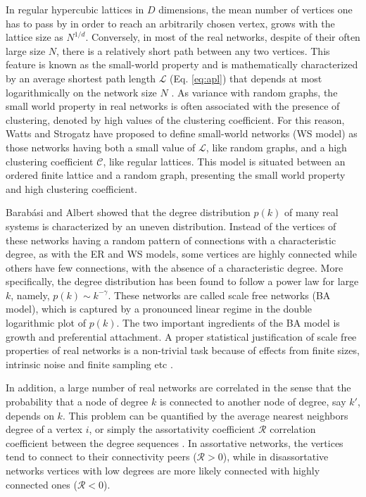 	In regular hypercubic lattices in $D$ dimensions, the mean number of vertices one has to pass by in order to reach an arbitrarily chosen vertex, grows with the lattice size as $N^{1/d}$. Conversely, in most of the real networks, despite of their often large size $N$, there is a relatively short path between any two vertices. This feature is known as the small-world property and is mathematically characterized by an average shortest path length $\mathcal{L}$ (Eq. \eqref{eq:apl}) that depends at most logarithmically on the network size $N$ \cite{Albert2002,Newman2003,Boccaletti2006}. As variance with random graphs, the small world property in real networks is often associated with the presence of clustering, denoted by high values of the clustering coefficient. For this reason, Watts and Strogatz \cite{Watts1998} have proposed to define small-world networks (WS model) as those networks having both a small value of $\mathcal{L}$, like random graphs, and a high clustering coefficient $\mathcal{C}$, like regular lattices.  This model is situated between an ordered finite lattice and a random graph, presenting the small world property and high clustering coefficient. 

	Barab\'asi and Albert \cite{Barabasi199} showed that the degree distribution $p(k)$ of many real systems is characterized by an uneven distribution. Instead of the vertices of these networks having a random pattern of connections with a characteristic degree, as with the ER and WS models, some vertices are highly connected while others have few connections, with the absence of a characteristic degree. More specifically, the degree distribution has been found to follow a power law for large $k$, namely, $p(k) \sim k^{-\gamma}$. These networks are called scale free networks (BA model), which is captured by a pronounced linear regime in the double logarithmic plot of $p(k)$. The two important ingredients of the BA model is growth and preferential attachment. A proper statistical justification of scale free properties of real networks is a non-trivial task because of effects from finite sizes, intrinsic noise and finite sampling etc \cite{Clauset2009}. 
	
	In addition, a large number of real networks are correlated in the sense that the probability that a node of degree $k$ is connected to another node of degree, say $k'$, depends on $k$. This problem can be quantified by the average nearest neighbors degree of a vertex $i$, or simply the assortativity coefficient $\mathcal{R}$ correlation coefficient between the degree sequences \cite{Newman2002}. In assortative networks, the vertices tend to connect to their connectivity peers ($\mathcal{R} > 0$), while in disassortative networks vertices with low degrees are more likely connected with highly connected ones ($\mathcal{R} < 0$). 
	

